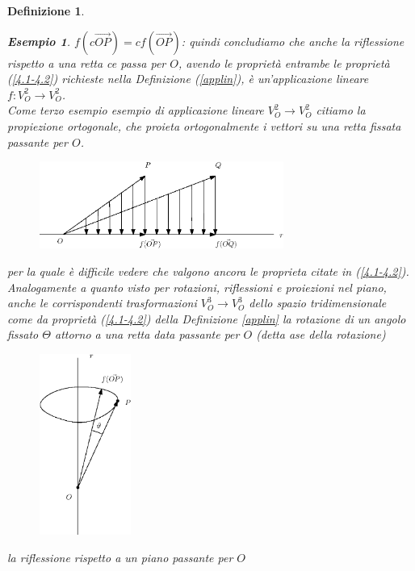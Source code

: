 \documentclass{book}
\newtheorem{definizione}{Definizione}
\newtheorem{esempio}{Esempio}
\begin{document}
\begin{definizione}
\begin{esempio}
    $f(c\vec{OP})=cf(\vec{OP})$: quindi concludiamo che anche la riflessione rispetto a una retta ce passa per
    $O$, avendo le proprietà entrambe le proprietà (\ref{4.1-4.2}) richieste nella Definizione (\ref{applin}),
    è un'applicazione lineare $f:V_O^2\to        V_O^2$.\\
    Come terzo esempio esempio di applicazione lineare $V_O^2\to V_O^2$ citiamo la propiezione ortogonale,
    che proieta ortogonalmente i vettori su una retta fissata passante per $O$.
    \begin{figure}[th]
      \centering
        \includegraphics[width=8cm]{img/finiti/imgex4-2-7.eps}
    \end{figure}
      
    per la quale è difficile vedere che valgono ancora le proprieta citate in (\ref{4.1-4.2}).\\
    Analogamente a quanto visto per rotazioni, riflessioni e proiezioni nel piano, anche le corrispondenti
    trasformazioni $V_O^3\to V_O^3$ dello spazio tridimensionale come da proprietà (\ref{4.1-4.2}) della
    Definizione \ref{applin} la rotazione di un angolo fissato $\Theta$ attorno a una retta data passante per $O$
    (detta ase della rotazione)
    \clearpage
    \begin{figure}[th]
      \centering
        \includegraphics[width=3cm]{img/finiti/imgex4-2-8.eps}
    \end{figure}
    la riflessione rispetto a un piano passante per $O$
  \end{esempio}
\end{definizione}
\end{document}
